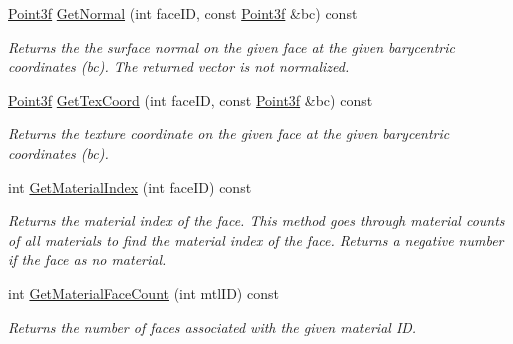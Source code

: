 \begin{Indent}
\begin{DoxyCompactItemize}
\mbox{\label{classcy_1_1_tri_mesh_afa937fd947f1b58ebad1b0f2d6386894}} 
\mbox{\hyperlink{cy_point_8h_aa1aa4fec5c403aa116dc50e9e94f85aa}{Point3f}} \mbox{\hyperlink{classcy_1_1_tri_mesh_afa937fd947f1b58ebad1b0f2d6386894}{Get\+Normal}} (int face\+ID, const \mbox{\hyperlink{cy_point_8h_aa1aa4fec5c403aa116dc50e9e94f85aa}{Point3f}} \&bc) const
\begin{DoxyCompactList}\small\item\em Returns the the surface normal on the given face at the given barycentric coordinates (bc). The returned vector is not normalized. \end{DoxyCompactList}\item 
\mbox{\label{classcy_1_1_tri_mesh_a3f0d11b98c3f5a181676feed26da0b7c}} 
\mbox{\hyperlink{cy_point_8h_aa1aa4fec5c403aa116dc50e9e94f85aa}{Point3f}} \mbox{\hyperlink{classcy_1_1_tri_mesh_a3f0d11b98c3f5a181676feed26da0b7c}{Get\+Tex\+Coord}} (int face\+ID, const \mbox{\hyperlink{cy_point_8h_aa1aa4fec5c403aa116dc50e9e94f85aa}{Point3f}} \&bc) const
\begin{DoxyCompactList}\small\item\em Returns the texture coordinate on the given face at the given barycentric coordinates (bc). \end{DoxyCompactList}\item 
\mbox{\label{classcy_1_1_tri_mesh_a17bcc0d0e03e86085438103caefd1213}} 
int \mbox{\hyperlink{classcy_1_1_tri_mesh_a17bcc0d0e03e86085438103caefd1213}{Get\+Material\+Index}} (int face\+ID) const
\begin{DoxyCompactList}\small\item\em Returns the material index of the face. This method goes through material counts of all materials to find the material index of the face. Returns a negative number if the face as no material. \end{DoxyCompactList}\item 
\mbox{\label{classcy_1_1_tri_mesh_a9fc8ef7872ac87aea372efc7b32a0e5d}} 
int \mbox{\hyperlink{classcy_1_1_tri_mesh_a9fc8ef7872ac87aea372efc7b32a0e5d}{Get\+Material\+Face\+Count}} (int mtl\+ID) const
\begin{DoxyCompactList}\small\item\em Returns the number of faces associated with the given material ID. \end{DoxyCompactList}\item 

\end{DoxyCompactItemize}
\end{Indent}
